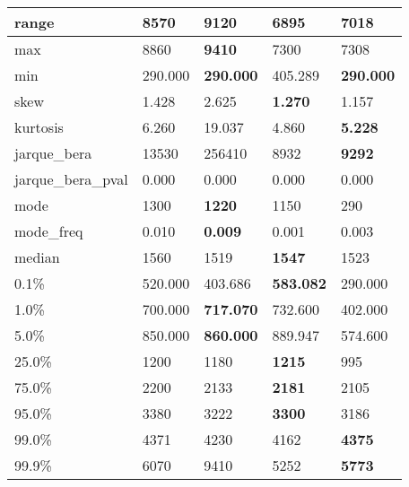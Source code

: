 \begin{table}[H]
\begin{tabular}{|l|m{10em}|m{10em}|m{10em}|m{10em}|}
\hline range & 8570 & \bfseries 9120 & \cellcolor[rgb]{0.9, 0.54, 0.52} 6895 & 7018 \\
\hline max & 8860 & \bfseries 9410 & \cellcolor[rgb]{0.9, 0.54, 0.52} 7300 & 7308 \\
\hline min & 290.000 & \bfseries 290.000 & \cellcolor[rgb]{0.9, 0.54, 0.52} 405.289 & \bfseries 290.000 \\
\hline skew & 1.428 & \cellcolor[rgb]{0.9, 0.54, 0.52} 2.625 & \bfseries 1.270 & 1.157 \\
\hline kurtosis & 6.260 & \cellcolor[rgb]{0.9, 0.54, 0.52} 19.037 & 4.860 & \bfseries 5.228 \\
\hline jarque\_bera & 13530 & \cellcolor[rgb]{0.9, 0.54, 0.52} 256410 & 8932 & \bfseries 9292 \\
\hline jarque\_bera\_pval & 0.000 & 0.000 & 0.000 & 0.000 \\
\hline mode & 1300 & \bfseries 1220 & 1150 & \cellcolor[rgb]{0.9, 0.54, 0.52} 290 \\
\hline mode\_freq & 0.010 & \bfseries 0.009 & \cellcolor[rgb]{0.9, 0.54, 0.52} 0.001 & 0.003 \\
\hline median & 1560 & \cellcolor[rgb]{0.9, 0.54, 0.52} 1519 & \bfseries 1547 & 1523 \\
\hline 0.1\% & 520.000 & 403.686 & \bfseries 583.082 & \cellcolor[rgb]{0.9, 0.54, 0.52} 290.000 \\
\hline 1.0\% & 700.000 & \bfseries 717.070 & 732.600 & \cellcolor[rgb]{0.9, 0.54, 0.52} 402.000 \\
\hline 5.0\% & 850.000 & \bfseries 860.000 & 889.947 & \cellcolor[rgb]{0.9, 0.54, 0.52} 574.600 \\
\hline 25.0\% & 1200 & 1180 & \bfseries 1215 & \cellcolor[rgb]{0.9, 0.54, 0.52} 995 \\
\hline 75.0\% & 2200 & 2133 & \bfseries 2181 & \cellcolor[rgb]{0.9, 0.54, 0.52} 2105 \\
\hline 95.0\% & 3380 & 3222 & \bfseries 3300 & \cellcolor[rgb]{0.9, 0.54, 0.52} 3186 \\
\hline 99.0\% & 4371 & 4230 & \cellcolor[rgb]{0.9, 0.54, 0.52} 4162 & \bfseries 4375 \\
\hline 99.9\% & 6070 & \cellcolor[rgb]{0.9, 0.54, 0.52} 9410 & 5252 & \bfseries 5773 \\
\hline
\end{tabular}
\end{table}
